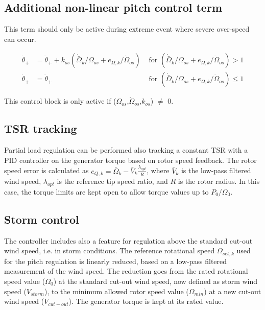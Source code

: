 


\subsection{Additional non-linear pitch control term}

This term should only be active during extreme event where severe over-speed can occur.

\begin{align}
	\dot{\theta}_{+} &= \dot{\theta}_{+} + k_{os} ( \dot{\bar{\Omega}}_k/\Omega_{os} + e_{\Omega,k}/\dot{\Omega}_{os} ) &\text{ for } ( \dot{\bar{\Omega}}_k/\Omega_{os} + e_{\Omega,k}/\dot{\Omega}_{os} ) > 1 \\
	\dot{\theta}_{+} &= \dot{\theta}_{+} &\text{ for } ( \dot{\bar{\Omega}}_k/\Omega_{os} + e_{\Omega,k}/\dot{\Omega}_{os} ) \leq 1	
\end{align}

This control block is only active if ($\Omega_{os}$,$\dot{\Omega}_{os}$,$k_{os}$) $\neq$ 0.

\subsection{TSR tracking}
Partial load regulation can be performed also tracking a constant TSR with a PID controller on the generator torque based on rotor speed feedback. The rotor speed error is calculated as $e_{Q,k}=\bar\Omega_k -\bar V_k \frac{\lambda_{opt}}{R}$, where $\bar V_k$ is the low-pass filtered wind speed, $\lambda_{opt}$ is the reference tip speed ratio, and $R$ is the rotor radius. In this case, the torque limits are kept open to allow torque values up to  $P_0/\Omega_0$.

\subsection{Storm control}
The controller includes also a feature for regulation above the standard cut-out wind speed, i.e. in storm conditions. The reference rotational speed $\Omega_{set, k}$ used for the pitch regulation is linearly reduced, based on a low-pass filtered measurement of the wind speed. The reduction goes from the rated rotational speed value ($\Omega_0$) at the standard cut-out wind speed, now defined as storm wind speed ($V_{storm}$), to the minimum allowed rotor speed value ($\Omega_{min}$) at a new cut-out wind speed ($V_{cut-out}$). The generator torque is kept at its rated value.


